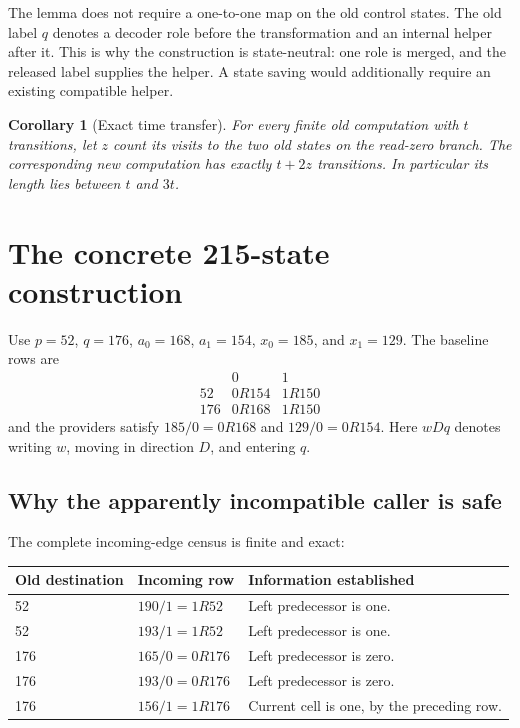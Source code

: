 \documentclass[11pt]{article}
\newtheorem{corollary}[theorem]{Corollary}
\theoremstyle{definition}\newtheorem{definition}[theorem]{Definition}
\theoremstyle{remark}\newtheorem{remark}[theorem]{Remark}
\begin{document}
The lemma does not require a one-to-one map on the old control states.
The old label $q$ denotes a decoder role before the transformation and an
internal helper after it. This is why the construction is state-neutral:
one role is merged, and the released label supplies the helper. A state
saving would additionally require an existing compatible helper.

\begin{corollary}[Exact time transfer]\label{cor:time}
For every finite old computation with $t$ transitions, let $z$ count its
visits to the two old states on the read-zero branch. The corresponding
new computation has exactly $t+2z$ transitions. In particular its length
lies between $t$ and $3t$.
\end{corollary}

\section{The concrete 215-state construction}
\label{sec:construction}

Use $p=52$, $q=176$, $a_0=168$, $a_1=154$, $x_0=185$, and $x_1=129$.
The baseline rows are
\[
\begin{array}{c|cc}
 &0&1\\\hline
52&0R154&1R150\\
176&0R168&1R150
\end{array}
\]
and the providers satisfy $185/0=0R168$ and $129/0=0R154$.
Here $wDq$ denotes writing $w$, moving in direction $D$, and entering $q$.

\subsection{Why the apparently incompatible caller is safe}

The complete incoming-edge census is finite and exact:
\begin{center}
\begin{tabular}{lll}
\toprule
Old destination & Incoming row & Information established \\
\midrule
52 & $190/1=1R52$ & Left predecessor is one. \\
52 & $193/1=1R52$ & Left predecessor is one. \\
176 & $165/0=0R176$ & Left predecessor is zero. \\
176 & $193/0=0R176$ & Left predecessor is zero. \\
176 & $156/1=1R176$ & Current cell is one, by the preceding row. \\
\bottomrule
\end{tabular}
\end{center}
\end{document}
